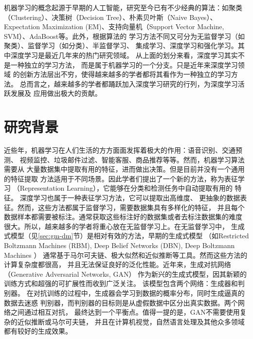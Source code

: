 机器学习的概念起源于早期的人工智能，研究至今已有不少经典的算法：如聚类（Clustering）、决策树（Decision Tree）、朴素贝叶斯（Naive Bayes）、Expectation Maximization (EM)、支持向量机（Support Vector Machine, SVM）、AdaBoost等。此外，根据算法的
学习方法不同又可分为无监督学习（如聚类）、监督学习（如分类）、半监督学习、
集成学习、深度学习和强化学习。其中深度学习是最近几年来的热门研究领域。
从上面的划分来看，深度学习其实不是一种独立的学习方法，
而是属于机器学习的一个分支。只是近年来深度学习领域
的创新方法层出不穷，使得越来越多的学者都将其看作为一种独立的学习方法。
总而言之，越来越多的学者都踊跃加入深度学习研究的行列，为深度学习活跃发展及
应用做出极大的贡献。

\section{研究背景}
近些年，机器学习在人们生活的方方面面发挥着极大的作用：语音识别、交通预测、
视频监控、垃圾邮件过滤、智能客服、商品推荐等等。然而，机器学习算法需要从
大量数据集中提取有用的特征，进而做出决策。但是目前并没有一个通用的特征提取
方法适用于不同场景。因此学者们提出了一个新的方法，称为表征学习
（Representation Learning），它能够在分类和检测任务中自动提取有用的
特征\cite{bengio2013representation}。
深度学习\cite{lecun2015deep}也属于一种表征学习方法，它可以提取出高维度、
更抽象的数据表征。然而，这些方法都属于监督学习，需要数据集具有多样化的特征，
并且每个数据样本都需要被标注。通常获取这些标注好的数据集或者去标注数据集的难度
很大。所以，越来越多的学者将重心放在无监督学习上。在无监督学习中，
生成式模型（见\ref{sec:gm-dm}节）是相对有效的方法，早期的生成式模型
（如Restricted Boltzmann Machines (RBM)\cite{smolensky1986information},
Deep Belief Networks (DBN)\cite{hinton2006fast}, Deep Boltzmann Machines
\cite{salakhutdinov2009deep}
）
通常基于马尔可夫链、极大似然和近似推断等工具。然而这些方法的计算复杂度都很高，
并且无法保证良好的泛化性能。近年来，生成对抗网络
（Generative Adversarial Networks, GAN）\cite{goodfellow2014generative}
作为新兴的生成式模型，因其新颖的训练方式和超强的可扩展性而收到广泛关注。
该模型包含两个网络：生成器和判别器。
在对抗训练的过程中，生成器会学习到数据的概率分布，同时生成逼真的数据去迷惑
判别器，而判别器的目标则是从虚假数据中区分出真实数据。两个网络之间通过相互对抗，
最终达到一个平衡点。值得一提的是，GAN不需要使用复杂的近似推断或马尔可夫链，
并且在计算机视觉，自然语言处理及其他众多领域都有较好的生成效果。


